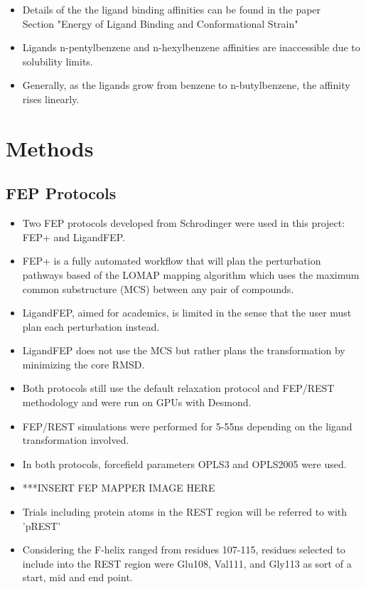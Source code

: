 \documentclass{article}
\begin{document}
    \begin{itemize}
    \item Details of the the ligand binding affinities can be found in the paper \cite{Merski2015}
       \\ Section "Energy of Ligand Binding and Conformational Strain"
    \item Ligands n-pentylbenzene and n-hexylbenzene affinities are inaccessible due to solubility limits.
    \item Generally, as the ligands grow from benzene to n-butylbenzene, the affinity rises linearly.
    \end{itemize}

\section{Methods}
\subsection{FEP Protocols}
   \begin{itemize}
   \item Two FEP protocols developed from Schrodinger were used in this project: FEP+ and LigandFEP.
   \item FEP+ is a fully automated workflow that will plan the perturbation pathways based of the LOMAP mapping algorithm which uses the maximum common substructure (MCS) between any pair of compounds.
   \item LigandFEP, aimed for academics, is limited in the sense that the user must plan each perturbation instead. 
   \item LigandFEP does not use the MCS but rather plans the transformation by minimizing the core RMSD.
   \item Both protocols still use the default relaxation protocol and FEP/REST methodology and were run on GPUs with Desmond.
   \item FEP/REST simulations were performed for 5-55ns depending on the ligand transformation involved. 
   \item In both protocols, forcefield parameters OPLS3 and OPLS2005 were used.
   \item ***INSERT FEP MAPPER IMAGE HERE
   \item Trials including protein atoms in the REST region will be referred to with 'pREST'
   \item Considering the F-helix ranged from residues 107-115, residues selected to include into the REST region were Glu108, Val111, and Gly113 as sort of a start, mid and end point. 
   \end{itemize}
\end{document}

